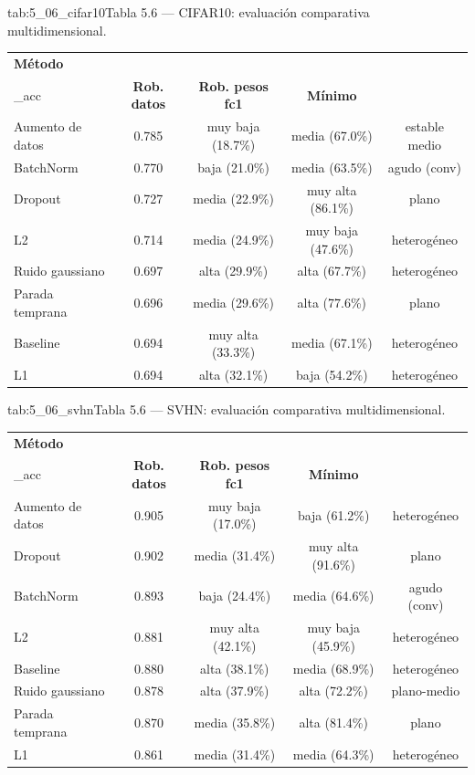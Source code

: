 \begin{table}{tab:5_06_cifar10}{Tabla 5.6 — CIFAR10: evaluación comparativa multidimensional.}
\small
\begin{tabular}{lcccc}
\toprule
\textbf{Método} & \textbf{val\\_acc} & \textbf{Rob. datos} & \textbf{Rob. pesos fc1} & \textbf{Mínimo} \\
\midrule
Aumento de datos & 0.785 & muy baja (18.7\%) & media (67.0\%) & estable medio \\
BatchNorm & 0.770 & baja (21.0\%) & media (63.5\%) & agudo (conv) \\
Dropout & 0.727 & media (22.9\%) & muy alta (86.1\%) & plano \\
L2 & 0.714 & media (24.9\%) & muy baja (47.6\%) & heterogéneo \\
Ruido gaussiano & 0.697 & alta (29.9\%) & alta (67.7\%) & heterogéneo \\
Parada temprana & 0.696 & media (29.6\%) & alta (77.6\%) & plano \\
Baseline & 0.694 & muy alta (33.3\%) & media (67.1\%) & heterogéneo \\
L1 & 0.694 & alta (32.1\%) & baja (54.2\%) & heterogéneo \\
\bottomrule
\end{tabular}
\end{table}

\begin{table}{tab:5_06_svhn}{Tabla 5.6 — SVHN: evaluación comparativa multidimensional.}
\small
\begin{tabular}{lcccc}
\toprule
\textbf{Método} & \textbf{val\\_acc} & \textbf{Rob. datos} & \textbf{Rob. pesos fc1} & \textbf{Mínimo} \\
\midrule
Aumento de datos & 0.905 & muy baja (17.0\%) & baja (61.2\%) & heterogéneo \\
Dropout & 0.902 & media (31.4\%) & muy alta (91.6\%) & plano \\
BatchNorm & 0.893 & baja (24.4\%) & media (64.6\%) & agudo (conv) \\
L2 & 0.881 & muy alta (42.1\%) & muy baja (45.9\%) & heterogéneo \\
Baseline & 0.880 & alta (38.1\%) & media (68.9\%) & heterogéneo \\
Ruido gaussiano & 0.878 & alta (37.9\%) & alta (72.2\%) & plano-medio \\
Parada temprana & 0.870 & media (35.8\%) & alta (81.4\%) & plano \\
L1 & 0.861 & media (31.4\%) & media (64.3\%) & heterogéneo \\
\bottomrule
\end{tabular}
\end{table}

